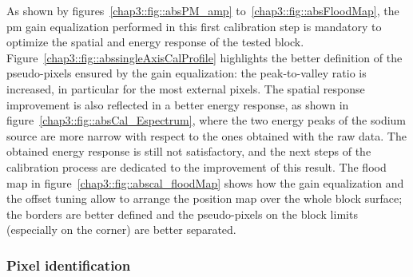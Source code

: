 As shown by figures~\ref{chap3::fig::absPM_amp} to~\ref{chap3::fig::absFloodMap}, the \gls{pm} gain equalization performed in this first calibration step is mandatory to optimize the spatial and energy response of the tested block. Figure~\ref{chap3::fig::abssingleAxisCalProfile} highlights the better definition of the pseudo-pixels ensured by the gain equalization: the peak-to-valley ratio is increased, in particular for the most external pixels. The spatial response improvement is also reflected in a better energy response, as shown in figure~\ref{chap3::fig::absCal_Espectrum}, where the two energy peaks of the sodium source are more narrow with respect to the ones obtained with the raw data. The obtained energy response is still not satisfactory, and the next steps of the calibration process are dedicated to the improvement of this result. The flood map in figure~\ref{chap3::fig::abscal_floodMap} shows how the gain equalization and the offset tuning allow to arrange the position map over the whole block surface; the borders are better defined and the pseudo-pixels on the block limits (especially on the corner) are better separated. 

\subsubsection{Pixel identification}\label{chap3::subsubsec::absPixelID}

